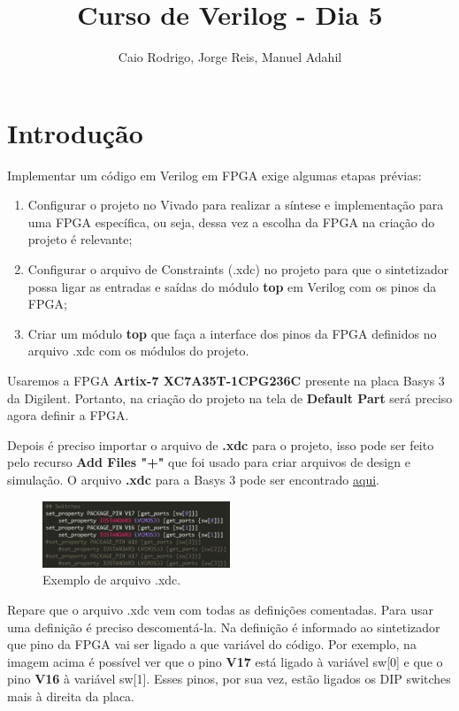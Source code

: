 \documentclass[a4paper]{article}
\title{Curso de Verilog - Dia 5}
\author{Caio Rodrigo, Jorge Reis, Manuel Adahil}
\date{} %
\begin{document}
\maketitle

\section*{Introdução}
Implementar um código em Verilog em FPGA exige algumas etapas prévias:

\begin{enumerate}
	\item Configurar o projeto no Vivado para realizar a síntese e implementação para uma FPGA específica, ou seja, dessa vez a escolha da FPGA na criação do projeto é relevante;
    \item Configurar o arquivo de Constraints (.xdc) no projeto para que o sintetizador possa ligar as entradas e saídas do módulo \textbf{top} em Verilog com os pinos da FPGA;
    \item Criar um módulo \textbf{top} que faça a interface dos pinos da FPGA definidos no arquivo .xdc  com os módulos do projeto.
\end{enumerate}


Usaremos a FPGA \textbf{Artix-7 XC7A35T-1CPG236C} presente na placa Basys 3 da Digilent. Portanto, na criação do projeto na tela de \textbf{Default Part} será preciso agora definir a FPGA.

Depois é preciso importar o arquivo de \textbf{.xdc} para o projeto, isso pode ser feito pelo recurso \textbf{Add Files "+"} que foi usado para criar arquivos de design e simulação. O arquivo \textbf{.xdc} para a Basys 3 pode ser encontrado \href{https://www.xilinx.com/support/documentation/university/Vivado-Teaching/HDL-Design/2015x/Basys3/Supporting%20Material/Basys3_Master.xdc}{aqui}. 

\begin{figure}[H]
	\centering
    \includegraphics[width=0.5\textwidth]{images/xdc_example.jpg}
    \caption*{Exemplo de arquivo .xdc.}
\end{figure}

Repare que o arquivo .xdc vem com todas as definições comentadas. Para usar uma definição é preciso descomentá-la. Na definição é informado ao sintetizador que pino da FPGA vai ser ligado a que variável do código. Por exemplo, na imagem acima é possível ver que o pino \textbf{V17} está ligado à variável sw[0] e que o pino \textbf{V16} à variável sw[1]. Esses pinos, por sua vez, estão ligados os DIP switches mais à direita da placa.
\end{document}
